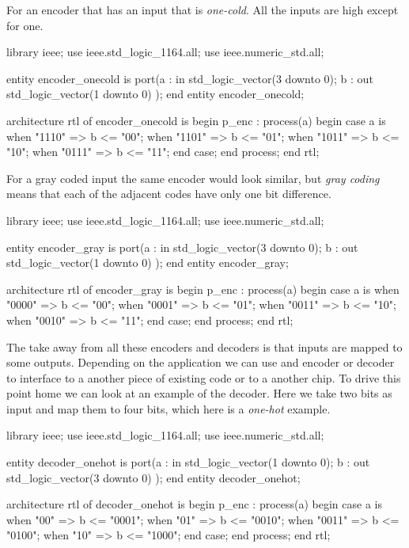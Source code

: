 For an encoder that has an input that is \emph{one-cold}. All the inputs are high except for one. 

\begin{VHDLlisting}[tabsize=4]
library ieee;
  use ieee.std_logic_1164.all;
  use ieee.numeric_std.all;
  
entity encoder_onecold is
port(a : in    std_logic_vector(3 downto 0);
     b :   out std_logic_vector(1 downto 0)
);
end entity encoder_onecold;

architecture rtl of encoder_onecold is
begin
    p_enc : process(a)
    begin
        case a is	
            when "1110" => 
                b <= "00";
            when "1101" => 
                b <= "01";
            when "1011" => 
                b <= "10";
            when "0111" => 
                b <= "11";
        end case;
    end process;
end rtl;
\end{VHDLlisting}
	
For a gray coded input the same encoder would look similar, but \emph{gray coding} means that each of the adjacent codes have only one bit difference.  

\begin{VHDLlisting}[tabsize=4]
library ieee;
  use ieee.std_logic_1164.all;
  use ieee.numeric_std.all;
  
entity encoder_gray is
port(a : in    std_logic_vector(3 downto 0);
     b :   out std_logic_vector(1 downto 0)
);
end entity encoder_gray;

architecture rtl of encoder_gray is
begin
    p_enc : process(a)
    begin
        case a is	
            when "0000" => 
                b <= "00";
            when "0001" => 
                b <= "01";
            when "0011" => 
                b <= "10";
            when "0010" => 
                b <= "11";
        end case;
    end process;
end rtl;
\end{VHDLlisting}
	
The take away from all these encoders and decoders is that inputs are mapped to some outputs. Depending on the application we can use and encoder or decoder to interface to a another piece of existing code or to a another chip. To drive this point home we can look at an example of the decoder. Here we take two bits as input and map them to four bits, which here is a \emph{one-hot} example.

\begin{VHDLlisting}[tabsize=4]
library ieee;
  use ieee.std_logic_1164.all;
  use ieee.numeric_std.all;
  
entity decoder_onehot is
port(a : in    std_logic_vector(1 downto 0);
     b :   out std_logic_vector(3 downto 0)
);
end entity decoder_onehot;

architecture rtl of decoder_onehot is
begin
    p_enc : process(a)
    begin
        case a is	
            when "00" => 
                b <= "0001";
            when "01" => 
                b <= "0010";
            when "0011" => 
                b <= "0100";
            when "10" => 
                b <= "1000";
        end case;
    end process;
end rtl;
\end{VHDLlisting}

